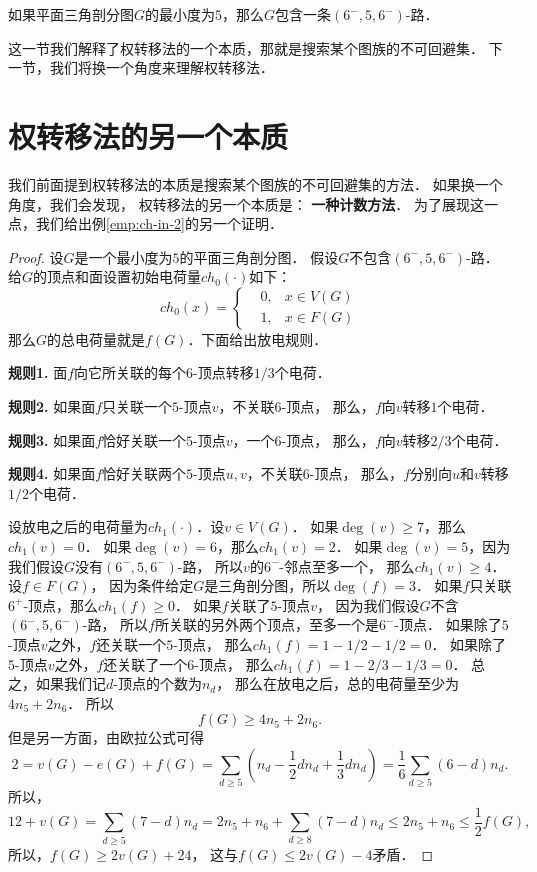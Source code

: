 \documentclass[cn,fancy,blue,11pt]{elegantbook}
\begin{document}
\begin{example}\label{emp:ch-in-2}
	如果平面三角剖分图$G$的最小度为$5$，那么$G$包含一条$(6^-,5,6^-)$-路．
\end{example}

这一节我们解释了权转移法的一个本质，那就是搜索某个图族的不可回避集．
下一节，我们将换一个角度来理解权转移法．

\section{权转移法的另一个本质}

我们前面提到权转移法的本质是搜索某个图族的不可回避集的方法．
如果换一个角度，我们会发现，
权转移法的另一个本质是：
\textbf{一种计数方法}．
为了展现这一点，我们给出例\ref{emp:ch-in-2}的另一个证明．

\vskip 10pt
\begin{proof}
	设$G$是一个最小度为$5$的平面三角剖分图．
	假设$G$不包含$(6^-,5,6^-)$-路．
	给$G$的顶点和面设置初始电荷量$ch_0(\cdot)$如下：
	\[
		ch_0(x)=\left\{
			\begin{aligned}
				&	0,	&	x\in V(G)\\
				&	1,	&	x\in F(G)
			\end{aligned}
		\right.
	\]
	那么$G$的总电荷量就是$f(G)$．下面给出放电规则．

	\begin{discharge}
		\textbf{规则1.} 面$f$向它所关联的每个$6$-顶点转移$1/3$个电荷．

		\textbf{规则2.} 如果面$f$只关联一个$5$-顶点$v$，不关联$6$-顶点，
		那么，$f$向$v$转移$1$个电荷．

		\textbf{规则3.} 如果面$f$恰好关联一个$5$-顶点$v$，一个$6$-顶点，
		那么，$f$向$v$转移$2/3$个电荷．

		\textbf{规则4.} 如果面$f$恰好关联两个$5$-顶点$u,v$，不关联$6$-顶点，
		那么，$f$分别向$u$和$v$转移$1/2$个电荷．
	\end{discharge}
	
	设放电之后的电荷量为$ch_1(\cdot)$．设$v\in V(G)$．
	如果$\deg(v)\ge7$，那么$ch_1(v)=0$．
	如果$\deg(v)=6$，那么$ch_1(v)=2$．
	如果$\deg(v)=5$，因为我们假设$G$没有$(6^-,5,6^-)$-路，
	所以$v$的$6^-$-邻点至多一个，
	那么$ch_1(v)\ge4$．
	设$f\in F(G)$，
	因为条件给定$G$是三角剖分图，所以$\deg(f)=3$．
	如果$f$只关联$6^+$-顶点，那么$ch_1(f)\ge0$．
	如果$f$关联了$5$-顶点$v$，
	因为我们假设$G$不含$(6^-,5,6^-)$-路，
	所以$f$所关联的另外两个顶点，至多一个是$6^-$-顶点．
	如果除了$5$-顶点$v$之外，$f$还关联一个$5$-顶点，
	那么$ch_1(f)=1-1/2-1/2=0$．
	如果除了$5$-顶点$v$之外，$f$还关联了一个$6$-顶点，
	那么$ch_1(f)=1-2/3-1/3=0$．
	总之，如果我们记$d$-顶点的个数为$n_d$，
	那么在放电之后，总的电荷量至少为$4n_5+2n_6$．
	所以\[f(G)\ge 4n_5+2n_6.\]
	但是另一方面，由欧拉公式可得
	\[2=v(G)-e(G)+f(G)=\sum_{d\ge 5}(n_d-\frac{1}{2}dn_d+\frac{1}{3}dn_d)
	=\frac{1}{6}\sum_{d\ge 5}(6-d)n_d.\]
	所以，
	\[12+v(G)=\sum_{d\ge5}(7-d)n_d=2n_5+n_6+\sum_{d\ge8}(7-d)n_d
	\le2n_5+n_6\le \frac{1}{2}f(G),\]
	所以，$f(G)\ge 2v(G)+24$，
	这与$f(G)\le 2v(G)-4$矛盾．
\end{proof}
\end{document}
